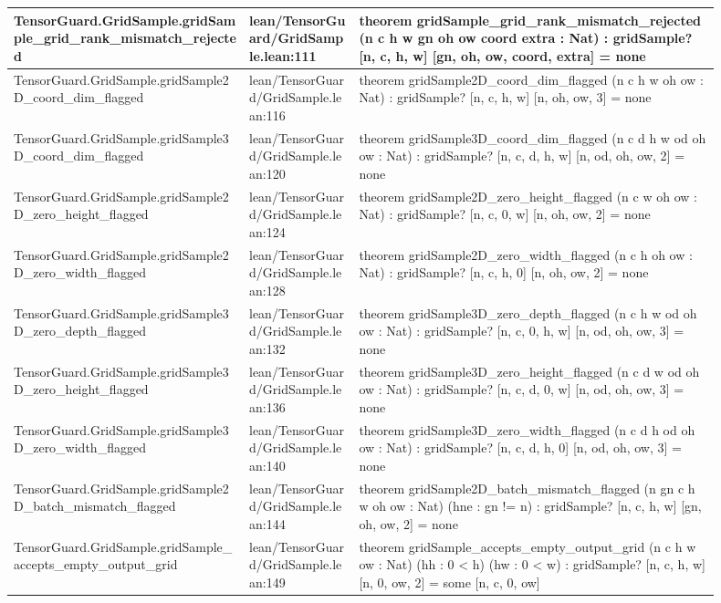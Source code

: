 \documentclass[10pt]{article}
\begin{document}
\begin{longtable}{|p{0.30\linewidth}|p{0.14\linewidth}|p{0.46\linewidth}|}
\hline
TensorGuard.GridSample.gridSample\_grid\_rank\_mismatch\_rejected & lean/TensorGuard/GridSample.lean:111 & theorem gridSample\_grid\_rank\_mismatch\_rejected (n c h w gn oh ow coord extra : Nat) : gridSample? [n, c, h, w] [gn, oh, ow, coord, extra] = none \\
\hline
TensorGuard.GridSample.gridSample2D\_coord\_dim\_flagged & lean/TensorGuard/GridSample.lean:116 & theorem gridSample2D\_coord\_dim\_flagged (n c h w oh ow : Nat) : gridSample? [n, c, h, w] [n, oh, ow, 3] = none \\
\hline
TensorGuard.GridSample.gridSample3D\_coord\_dim\_flagged & lean/TensorGuard/GridSample.lean:120 & theorem gridSample3D\_coord\_dim\_flagged (n c d h w od oh ow : Nat) : gridSample? [n, c, d, h, w] [n, od, oh, ow, 2] = none \\
\hline
TensorGuard.GridSample.gridSample2D\_zero\_height\_flagged & lean/TensorGuard/GridSample.lean:124 & theorem gridSample2D\_zero\_height\_flagged (n c w oh ow : Nat) : gridSample? [n, c, 0, w] [n, oh, ow, 2] = none \\
\hline
TensorGuard.GridSample.gridSample2D\_zero\_width\_flagged & lean/TensorGuard/GridSample.lean:128 & theorem gridSample2D\_zero\_width\_flagged (n c h oh ow : Nat) : gridSample? [n, c, h, 0] [n, oh, ow, 2] = none \\
\hline
TensorGuard.GridSample.gridSample3D\_zero\_depth\_flagged & lean/TensorGuard/GridSample.lean:132 & theorem gridSample3D\_zero\_depth\_flagged (n c h w od oh ow : Nat) : gridSample? [n, c, 0, h, w] [n, od, oh, ow, 3] = none \\
\hline
TensorGuard.GridSample.gridSample3D\_zero\_height\_flagged & lean/TensorGuard/GridSample.lean:136 & theorem gridSample3D\_zero\_height\_flagged (n c d w od oh ow : Nat) : gridSample? [n, c, d, 0, w] [n, od, oh, ow, 3] = none \\
\hline
TensorGuard.GridSample.gridSample3D\_zero\_width\_flagged & lean/TensorGuard/GridSample.lean:140 & theorem gridSample3D\_zero\_width\_flagged (n c d h od oh ow : Nat) : gridSample? [n, c, d, h, 0] [n, od, oh, ow, 3] = none \\
\hline
TensorGuard.GridSample.gridSample2D\_batch\_mismatch\_flagged & lean/TensorGuard/GridSample.lean:144 & theorem gridSample2D\_batch\_mismatch\_flagged (n gn c h w oh ow : Nat) (hne : gn != n) : gridSample? [n, c, h, w] [gn, oh, ow, 2] = none \\
\hline
TensorGuard.GridSample.gridSample\_accepts\_empty\_output\_grid & lean/TensorGuard/GridSample.lean:149 & theorem gridSample\_accepts\_empty\_output\_grid (n c h w ow : Nat) (hh : 0 < h) (hw : 0 < w) : gridSample? [n, c, h, w] [n, 0, ow, 2] = some [n, c, 0, ow] \\

\end{longtable}
\end{document}
